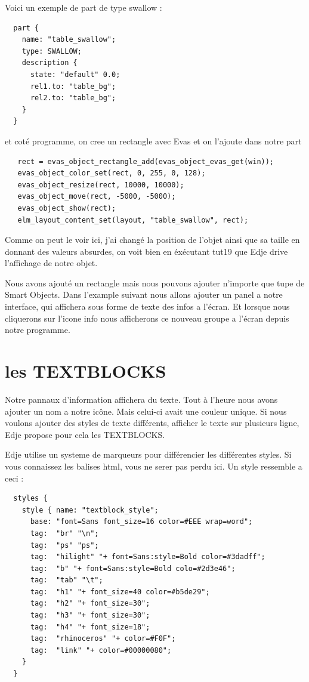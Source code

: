 \documentclass[a4paper]{efr}
\begin{document}
Voici un exemple de part de type swallow :
\begin{lstlisting}
  part {
    name: "table_swallow";
    type: SWALLOW;
    description {
      state: "default" 0.0;
      rel1.to: "table_bg";
      rel2.to: "table_bg";
    }
  }
\end{lstlisting}

et coté programme, on cree un rectangle avec Evas et on l'ajoute dans notre part
\begin{lstlisting}
   rect = evas_object_rectangle_add(evas_object_evas_get(win));
   evas_object_color_set(rect, 0, 255, 0, 128);
   evas_object_resize(rect, 10000, 10000);
   evas_object_move(rect, -5000, -5000);
   evas_object_show(rect);
   elm_layout_content_set(layout, "table_swallow", rect);
\end{lstlisting}

Comme on peut le voir ici, j'ai changé la position de l'objet ainsi que sa
taille en donnant des valeurs absurdes, on voit bien en éxécutant tut19 que
Edje drive l'affichage de notre objet.

Nous avons ajouté un rectangle mais nous pouvons ajouter n'importe que tupe
de Smart Objects.
Dans l'example suivant nous allons ajouter un panel a notre interface, qui
affichera sous forme de texte des infos a l'écran. Et lorsque nous cliquerons
sur l'icone info nous afficherons ce nouveau groupe a l'écran depuis notre
programme.

\section{les TEXTBLOCKS}

Notre pannaux d'information affichera du texte. Tout à l'heure nous avons
ajouter un nom a notre icône. Mais celui-ci avait une couleur unique. Si nous
voulons ajouter des styles de texte différents, afficher le texte sur plusieurs
ligne, Edje propose pour cela les TEXTBLOCKS.

Edje utilise un systeme de marqueurs pour différencier les différentes styles.
Si vous connaissez les balises html, vous ne serer pas perdu ici.
Un style ressemble a ceci :
\begin{lstlisting}
  styles {
    style { name: "textblock_style";
      base: "font=Sans font_size=16 color=#EEE wrap=word";
      tag:  "br" "\n";
      tag:  "ps" "ps";
      tag:  "hilight" "+ font=Sans:style=Bold color=#3dadff";
      tag:  "b" "+ font=Sans:style=Bold colo=#2d3e46";
      tag:  "tab" "\t";
      tag:  "h1" "+ font_size=40 color=#b5de29";
      tag:  "h2" "+ font_size=30";
      tag:  "h3" "+ font_size=30";
      tag:  "h4" "+ font_size=18";
      tag:  "rhinoceros" "+ color=#F0F";
      tag:  "link" "+ color=#00000080";
    }
  }
\end{lstlisting}
\end{document}
